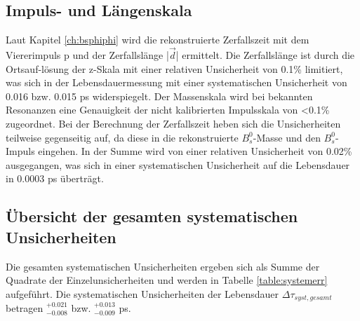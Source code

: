 \documentclass{article}
\begin{document}

\subsection{Impuls- und Längenskala}
Laut Kapitel \ref{ch:bsphiphi} wird die rekonstruierte Zerfallszeit mit dem Viererimpuls p und der Zerfallslänge |$\vec{d}$| ermittelt. Die Zerfallslänge ist durch die Ortsauf-lösung der z-Skala mit einer relativen Unsicherheit von 0.1\%  \cite{mBsoszi} limitiert, was sich in der Lebensdauermessung mit einer systematischen Unsicherheit von 0.016 bzw. 0.015 ps widerspiegelt.
Der Massenskala wird bei bekannten Resonanzen eine Genauigkeit der nicht kalibrierten Impulsskala von <0.1\% zugeordnet. Bei der Berechnung der Zerfallszeit heben sich die Unsicherheiten teilweise gegenseitig auf, da diese in die rekonstruierte $B_s^0$-Masse und den $B_s^0$-Impuls eingehen. In der Summe wird von einer relativen Unsicherheit von 0.02\%  \cite{mBsoszi} ausgegangen, was sich in einer systematischen Unsicherheit auf die Lebensdauer in 0.0003 ps überträgt.



\subsection{Übersicht der gesamten systematischen Unsicherheiten}

Die gesamten systematischen Unsicherheiten ergeben sich als Summe der Quadrate der Einzelunsicherheiten und werden in Tabelle \ref{table:systemerr} aufgeführt. Die systematischen Unsicherheiten der Lebensdauer $\Delta\tau_{syst,gesamt}$ betragen  $^{+0.021}_{-0.008}$ bzw. $^{+0.013}_{-0.009}$ ps.

\pagebreak[4]
\end{document}
